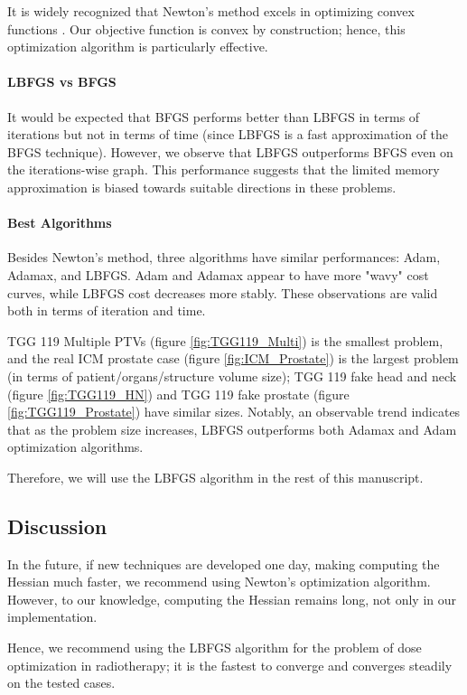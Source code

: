 It is widely recognized that Newton's method excels in optimizing convex functions \cite{PoczosTibshirani2013}.
Our objective function is convex by construction; hence, this optimization algorithm is particularly effective.

\paragraph{LBFGS vs BFGS}
It would be expected that BFGS performs better than LBFGS in terms of iterations but not in terms of time (since LBFGS is a fast approximation of the BFGS technique).
However, we observe that LBFGS outperforms BFGS even on the iterations-wise graph.
This performance suggests that the limited memory approximation is biased towards suitable directions in these problems.

\paragraph{Best Algorithms}
Besides Newton's method, three algorithms have similar performances: Adam, Adamax, and LBFGS.
Adam and Adamax appear to have more "wavy" cost curves, while LBFGS cost decreases more stably.
These observations are valid both in terms of iteration and time.

TGG 119 Multiple PTVs (figure \ref{fig:TGG119_Multi}) is the smallest problem, and the real ICM prostate case (figure \ref{fig:ICM_Prostate}) is the largest problem (in terms of patient/organs/structure volume size);
TGG 119 fake head and neck (figure \ref{fig:TGG119_HN}) and TGG 119 fake prostate (figure \ref{fig:TGG119_Prostate}) have similar sizes.
Notably, an observable trend indicates that as the problem size increases, LBFGS outperforms both Adamax and Adam optimization algorithms.

Therefore, we will use the LBFGS algorithm in the rest of this manuscript.

\subsection{Discussion}
In the future, if new techniques are developed one day, making computing the Hessian much faster, we recommend using Newton's optimization algorithm.
However, to our knowledge, computing the Hessian remains long, not only in our implementation.

Hence, we recommend using the LBFGS algorithm for the problem of dose optimization in radiotherapy;
it is the fastest to converge and converges steadily on the tested cases.
